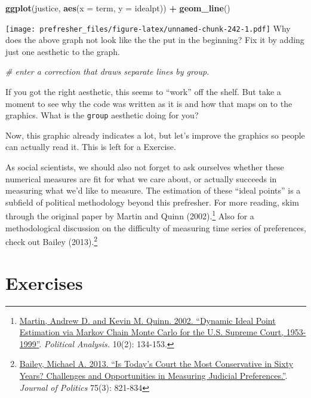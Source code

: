 \documentclass[
]{book}
\newenvironment{Shaded}{\begin{snugshade}}{\end{snugshade}}
\newcommand{\CommentTok}[1]{\textcolor[rgb]{0.56,0.35,0.01}{\textit{#1}}}
\newcommand{\DataTypeTok}[1]{\textcolor[rgb]{0.13,0.29,0.53}{#1}}
\newcommand{\KeywordTok}[1]{\textcolor[rgb]{0.13,0.29,0.53}{\textbf{#1}}}
\newcommand{\NormalTok}[1]{#1}
\newcommand{\OperatorTok}[1]{\textcolor[rgb]{0.81,0.36,0.00}{\textbf{#1}}}
\newcommand{\StringTok}[1]{\textcolor[rgb]{0.31,0.60,0.02}{#1}}
\theoremstyle{definition}
\theoremstyle{definition}
\theoremstyle{definition}
\theoremstyle{remark}
\begin{document}
\begin{Shaded}
\begin{Highlighting}[]
\KeywordTok{ggplot}\NormalTok{(justice, }\KeywordTok{aes}\NormalTok{(}\DataTypeTok{x =}\NormalTok{ term, }\DataTypeTok{y =}\NormalTok{ idealpt)) }\OperatorTok{+}
\StringTok{  }\KeywordTok{geom\_line}\NormalTok{()}
\end{Highlighting}
\end{Shaded}

\texttt{[image: prefresher\_files/figure-latex/unnamed-chunk-242-1.pdf]}
Why does the above graph not look like the the put in the beginning? Fix it by adding just one aesthetic to the graph.

\begin{Shaded}
\begin{Highlighting}[]
\CommentTok{\# enter a correction that draws separate lines by group.}
\end{Highlighting}
\end{Shaded}

If you got the right aesthetic, this seems to ``work'' off the shelf. But take a moment to see why the code was written as it is and how that maps on to the graphics. What is the \texttt{group} aesthetic doing for you?

Now, this graphic already indicates a lot, but let's improve the graphics so people can actually read it. This is left for a Exercise.

As social scientists, we should also not forget to ask ourselves whether these numerical measures are fit for what we care about, or actually succeeds in measuring what we'd like to measure. The estimation of these ``ideal points'' is a subfield of political methodology beyond this prefresher. For more reading, skim through the original paper by Martin and Quinn (2002).\footnote{\href{http://mqscores.lsa.umich.edu/media/pa02.pdf}{Martin, Andrew D. and Kevin M. Quinn. 2002. ``Dynamic Ideal Point Estimation via Markov Chain Monte Carlo for the U.S. Supreme Court, 1953-1999''}. \emph{Political Analysis.} 10(2): 134-153.} Also for a methodological discussion on the difficulty of measuring time series of preferences, check out Bailey (2013).\footnote{\href{https://michaelbailey.georgetown.domains/wp-content/uploads/2018/05/JOP_proofs_June2013.pdf}{Bailey, Michael A. 2013. ``Is Today's Court the Most Conservative in Sixty Years? Challenges and Opportunities in Measuring Judicial Preferences.''}. \emph{Journal of Politics} 75(3): 821-834}

\hypertarget{exercises-3}{%
\section*{Exercises}\label{exercises-3}}
\end{document}
